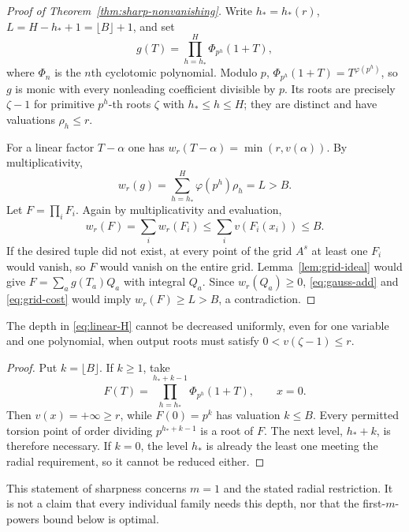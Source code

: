 \begin{proof}[Proof of Theorem~\ref{thm:sharp-nonvanishing}]
Write $h_*=h_*(r)$, $L=H-h_*+1=\lfloor B\rfloor+1$, and set
\begin{equation}
 g(T)=\prod_{h=h_*}^{H}\Phi_{p^h}(1+T),
 \label{eq:cyclotomic-grid-poly}
\end{equation}
where $\Phi_n$ is the $n$th cyclotomic polynomial. Modulo $p$,
$\Phi_{p^h}(1+T)=T^{\varphi(p^h)}$, so $g$ is monic with every
nonleading coefficient divisible by $p$. Its roots are precisely
$\zeta-1$ for primitive $p^h$-th roots $\zeta$ with $h_*\leq h\leq H$;
they are distinct and have valuations $\rho_h\leq r$.

For a linear factor $T-\alpha$ one has
$w_r(T-\alpha)=\min(r,v(\alpha))$. By multiplicativity,
\begin{equation}
 w_r(g)=\sum_{h=h_*}^{H}\varphi(p^h)\rho_h=L>B.
 \label{eq:grid-cost}
\end{equation}
Let $F=\prod_iF_i$. Again by multiplicativity and evaluation,
\[
 w_r(F)=\sum_iw_r(F_i)\leq\sum_iv(F_i(x_i))\leq B.
\]
If the desired tuple did not exist, at every point of the grid $A^s$ at
least one $F_i$ would vanish, so $F$ would vanish on the entire grid.
Lemma~\ref{lem:grid-ideal} would give $F=\sum_ag(T_a)Q_a$ with integral
$Q_a$. Since $w_r(Q_a)\geq0$, \eqref{eq:gauss-add} and
\eqref{eq:grid-cost} would imply $w_r(F)\geq L>B$, a contradiction.
\end{proof}

\begin{proposition}
\label{prop:sharpness}
The depth in \eqref{eq:linear-H} cannot be decreased uniformly, even for
one variable and one polynomial, when output roots must satisfy
$0<v(\zeta-1)\leq r$.
\end{proposition}

\begin{proof}
Put $k=\lfloor B\rfloor$. If $k\geq1$, take
\[
 F(T)=\prod_{h=h_*}^{h_*+k-1}\Phi_{p^h}(1+T),\qquad x=0.
\]
Then $v(x)=+\infty\geq r$, while $F(0)=p^k$ has valuation $k\leq B$.
Every permitted torsion point of order dividing $p^{h_*+k-1}$ is a root
of $F$. The next level, $h_*+k$, is therefore necessary. If $k=0$, the
level $h_*$ is already the least one meeting the radial requirement, so
it cannot be reduced either.
\end{proof}

This statement of sharpness concerns $m=1$ and the stated radial
restriction. It is not a claim that every individual family needs this
depth, nor that the first-$m$-powers bound below is optimal.

